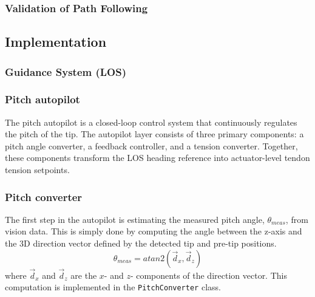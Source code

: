 \subsubsection{Validation of Path Following}


\subsection{Implementation}

\subsubsection{Guidance System (LOS)}


\subsubsection{Pitch autopilot}
The pitch autopilot is a closed-loop control system that continuously regulates the pitch of the tip. The autopilot layer consists of three primary components: a pitch angle converter, a feedback controller, and a tension converter. Together, these components transform the LOS heading reference into actuator-level tendon tension setpoints.

\subsubsection{Pitch converter}
The first step in the autopilot is estimating the measured pitch angle, \(\theta_{meas}\), from vision data. This is simply done by computing the angle between the z-axis and the 3D direction vector defined by the detected tip and pre-tip positions. 
\begin{equation}
    \theta_{meas} = atan2(\vec{d}_x,\vec{d}_z)
\end{equation}
where \(\vec{d}_x\) and \(\vec{d}_z\) are the \(x\)- and \(z\)- components of the direction vector. This computation is implemented in the \texttt{PitchConverter} class.

